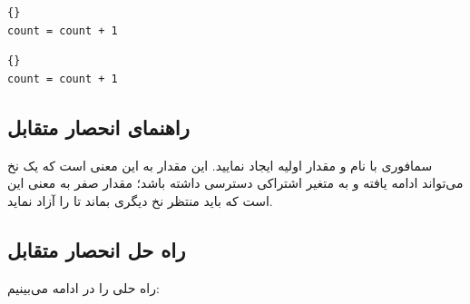 \documentclass{book}
\newcommand{\clearemptydoublepage}{\newpage\cleardoublepage}
\begin{document}
\begin{latin}
\begin{minipage}[t]{2in}
\begin{latin}
\begin{lstlisting}[title=\rl{نخ \lr{A}}]{}
count = count + 1
\end{lstlisting}
\end{latin}
\end{minipage}
\hfill
\begin{minipage}[t]{2in}
\begin{latin}
\begin{lstlisting}[title=\rl{نخ \lr{B}}]{}
count = count + 1
\end{lstlisting}
\end{latin}
\end{minipage}
\end{latin}

\clearemptydoublepage
\subsection{راهنمای انحصار متقابل}

    سمافوری با نام  و مقدار اولیه  ایجاد نمایید. 
    این مقدار به این معنی است که یک نخ می‌تواند ادامه یافته و به متغیر اشتراکی دسترسی داشته باشد؛ مقدار صفر به معنی این است که 
    باید منتظر نخ دیگری بماند تا  را آزاد نماید. 


\clearemptydoublepage
\subsection{  راه حل انحصار متقابل}

    راه حلی را در ادامه می‌بینیم:
\end{document}
